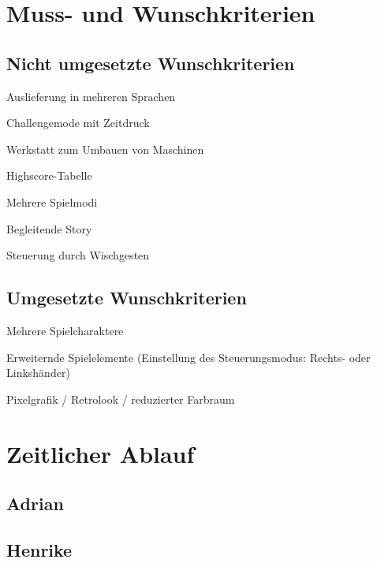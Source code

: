 \documentclass[parskip=full]{scrreprt}
\begin{document}
\chapter{Muss- und Wunschkriterien}

\section{Nicht umgesetzte Wunschkriterien}

\begin{description}
	\item Auslieferung in mehreren Sprachen
	\item Challengemode mit Zeitdruck
	\item Werkstatt zum Umbauen von Maschinen
	\item Highscore-Tabelle
	\item Mehrere Spielmodi
	\item Begleitende Story
	\item Steuerung durch Wischgesten
\end{description}

\section{Umgesetzte Wunschkriterien}

\begin{description}
	\item Mehrere Spielcharaktere
	\item Erweiternde Spielelemente (Einstellung des Steuerungsmodus: Rechts- oder Linkshänder)
	\item Pixelgrafik / Retrolook / reduzierter Farbraum
\end{description}

\chapter{Zeitlicher Ablauf}

\section{Adrian}

\begin{description}
	\item[]
\end{description}

\section{Henrike}
\end{document}
